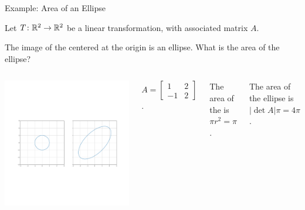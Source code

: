 \documentclass[xcolor=dvipsnames,aspectratio=169,t]{beamer}
\begin{document}
\begin{frame}{Example: Area of an Ellipse}
  \medskip
  
  Let $T\colon \mathbb{R}^2 \to \mathbb{R}^2$ be a linear transformation, with associated matrix $A$.
  
  The image of the  centered at the origin is an \alert{ellipse}.
  What is the \alert{area} of the ellipse?
  \vspace*{2em}
  
  \begin{columns}[T]
  \vspace*{-9em}%
  \hspace*{-2.5em}\includegraphics[scale=.25]{images/ellipse.pdf}%
  
  $A=\begin{bmatrix} 1 & 2 \\ -1 & 2 \end{bmatrix}$.
  \bigskip
  
  \pause
  The area of the  is $\pi r^2 = \pi$.
  \medskip
  
  The area of the \alert{ellipse} is $|\det A| \pi = 4\pi$.
  \end{columns}

  
  
\end{frame}
\end{document}

